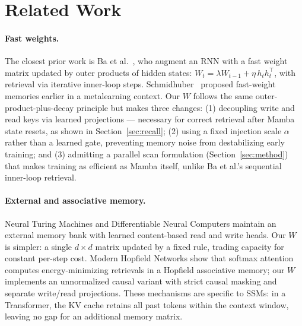 \documentclass{article}
\begin{document}
\clearpage
\section{Related Work}

\paragraph{Fast weights.}
The closest prior work is Ba et al.~\citep{ba2016using}, who augment an RNN with a fast weight matrix updated by outer products of hidden states: $W_t = \lambda W_{t-1} + \eta\, h_t h_t^\top$, with retrieval via iterative inner-loop steps. Schmidhuber~\citep{schmidhuber1992learning} proposed fast-weight memories earlier in a metalearning context. Our $W$ follows the same outer-product-plus-decay principle but makes three changes: (1) decoupling write and read keys via learned projections --- necessary for correct retrieval after Mamba state resets, as shown in Section~\ref{sec:recall}; (2) using a fixed injection scale $\alpha$ rather than a learned gate, preventing memory noise from destabilizing early training; and (3) admitting a parallel scan formulation (Section~\ref{sec:method}) that makes training as efficient as Mamba itself, unlike Ba et al.'s sequential inner-loop retrieval.

\paragraph{External and associative memory.}
Neural Turing Machines \citep{graves2014neural} and Differentiable Neural Computers \citep{graves2016hybrid} maintain an external memory bank with learned content-based read and write heads. Our $W$ is simpler: a single $d \times d$ matrix updated by a fixed rule, trading capacity for constant per-step cost. Modern Hopfield Networks \citep{ramsauer2021hopfield} show that softmax attention computes energy-minimizing retrievals in a Hopfield associative memory; our $W$ implements an unnormalized causal variant with strict causal masking and separate write/read projections. These mechanisms are specific to SSMs: in a Transformer, the KV cache retains all past tokens within the context window, leaving no gap for an additional memory matrix.
\end{document}
